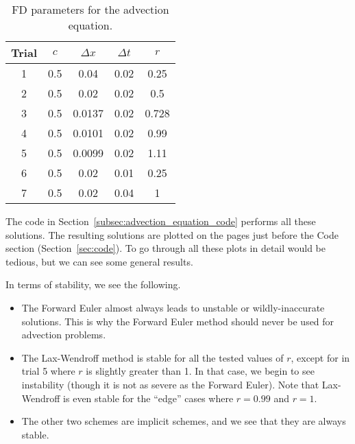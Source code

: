 \documentclass[twocolumn]{myarticle}
\begin{document}
\begin{table}[ht]
    \centering
    \begin{tabular}{ccccc}
        \toprule
        Trial & $ c $ & $ \Delta x $ & $ \Delta t $ & $ r $
        \\
        \midrule
        1 & 0.5 & 0.04 & 0.02 & 0.25
        \\
        2 & 0.5 & 0.02 & 0.02 & 0.5
        \\
        3 & 0.5 & 0.0137 & 0.02 & 0.728
        \\
        4 & 0.5 & 0.0101 & 0.02 & 0.99
        \\
        5 & 0.5 & 0.0099 & 0.02 & 1.11
        \\
        6 & 0.5 & 0.02 & 0.01 & 0.25
        \\
        7 & 0.5 & 0.02 & 0.04 & 1
        \\
        \bottomrule
    \end{tabular}
    \caption{FD parameters for the advection equation.}
    \label{tab:advection_parameters}
\end{table}

The code in Section~\ref{subsec:advection_equation_code} performs all these solutions.
The resulting solutions are plotted on the pages just before the Code section (Section~\ref{sec:code}).
To go through all these plots in detail would be tedious, but we can see some general results.

In terms of stability, we see the following.
\begin{itemize}
\item
    The Forward Euler almost always leads to unstable or wildly-inaccurate solutions.
    This is why the Forward Euler method should never be used for advection problems.
\item
    The Lax-Wendroff method is stable for all the tested values of $ r $, except for in trial 5 where $ r $ is slightly greater than 1.
    In that case, we begin to see instability (though it is not as severe as the Forward Euler).
    Note that Lax-Wendroff is even stable for the ``edge'' cases where $ r = 0.99 $ and $ r = 1 $.
\item
    The other two schemes are implicit schemes, and we see that they are always stable.
\end{itemize}
\end{document}
